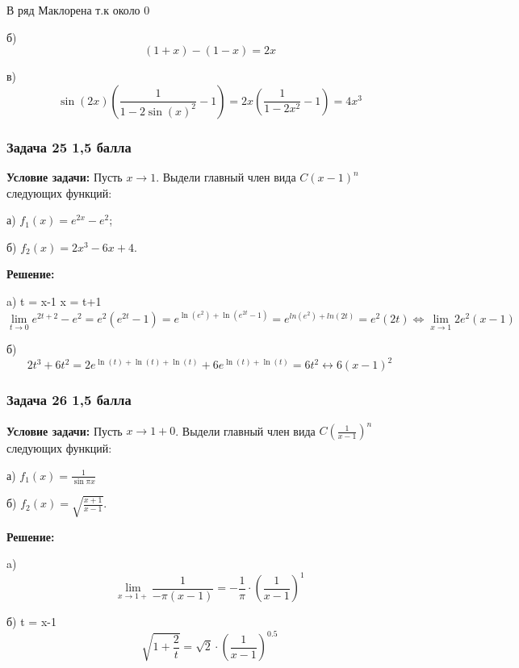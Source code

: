 \documentclass[a4paper,12pt]{article}
\begin{document}
В ряд Маклорена т.к около 0

б) 
\[
(1+x)-(1-x) = 2x
\]

в)
\[
\sin(2x)(\frac{1}{1-2\sin(x)^2}-1)=2x(\frac{1}{1-2x^2}-1) = 4x^3
\]

\vspace{1cm}

\subsubsection{Задача 25 \hfill 1,5 балла}
\textbf{Условие задачи:} Пусть \( x \to 1 \). Выдели главный член вида \( C(x - 1)^n \) следующих функций:

а) \( f_1(x) = e^{2x} - e^2 \);

б) \( f_2(x) = 2x^3 - 6x + 4 \).

\textbf{Решение: } 

a)
t = x-1
x = t+1
\[
\lim_{t \to 0} e^{2t+2}-e^2 =  e^2(e^{2t}-1) = e^{\ln(e^2)+\ln(e^{2t}-1)}=e^{ln(e^2)+ln(2t)}=e^2(2t) \Longleftrightarrow \lim_{x \to 1} 2e^2(x-1)
\]

б)
\[
2t^3+6t^2=2e^{\ln(t) + \ln(t) + \ln(t)} + 6e^{\ln(t) + \ln(t)}=6t^2 \longleftrightarrow 6(x-1)^2
\]



\vspace{1cm}

\subsubsection{Задача 26 \hfill 1,5 балла}
\textbf{Условие задачи:} Пусть \( x \to 1 + 0 \). Выдели главный член вида \( C \left( \frac{1}{x - 1} \right)^n \) следующих функций:

а) \( f_1(x) = \frac{1}{\sin \pi x} \)

б) \( f_2(x) = \sqrt{\frac{x+1}{x-1}} \).

\textbf{Решение: }

a)
\[
\lim_{x \to 1+} \frac{1}{-\pi(x-1)} = -\frac{1}{\pi} \cdot (\frac{1}{x-1})^1
\]

б)
t = x-1
\[
\sqrt{1+\frac{2}{t}} = \sqrt{2}\cdot(\frac{1}{x-1})^{0.5}
\]
\end{document}

